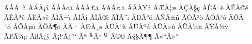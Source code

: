 \def\tura#1{{\edef\scf@{\the\scriptfont\fam}%
 \ifdim\fontdimen6\scf@=0pt\else\scf@\fi $^{\hbox{\b{#1}}}$}}

\def\do#1#2{\expandafter\def
 \csname\string^^c2\string#1@tex\endcsname{\string#1}}\doutfA

\def\dotexA{%
 \do^^c3^^80{\`A}\do^^c3^^a0{\`a}%
 \do^^c3^^81{\'A}\do^^c3^^a1{\'a}%
 \do^^c3^^82{\^A}\do^^c3^^a2{\^a}%
 \do^^c3^^83{\~A}\do^^c3^^a3{\~a}%
 \do^^c3^^84{\"A}\do^^c3^^a4{\"a}%
 \do^^c3^^85{\AA}\do^^c3^^a5{\aa}%
 \do^^c3^^86{\AE}\do^^c3^^a6{\ae}%
 \do^^c3^^87{\c C}\do^^c3^^a7{\c c}%
 \do^^c3^^88{\`E}\do^^c3^^a8{\`e}%
 \do^^c3^^89{\'E}\do^^c3^^a9{\'e}%
 \do^^c3^^8a{\^E}\do^^c3^^aa{\^e}%
 \do^^c3^^8b{\"E}\do^^c3^^ab{\"e}%
 \do^^c3^^8c{\`I}\do^^c3^^ac{\`\i}%
 \do^^c3^^8d{\'I}\do^^c3^^ad{\'\i}%
 \do^^c3^^8e{\^I}\do^^c3^^ae{\^\i}%
 \do^^c3^^8f{\"I}\do^^c3^^af{\"\i}%
 \do^^c3^^90{D}\do^^c3^^b0{d}%
 \do^^c3^^91{\~N}\do^^c3^^b1{\~n}%
 \do^^c3^^92{\`O}\do^^c3^^b2{\`o}%
 \do^^c3^^93{\'O}\do^^c3^^b3{\'o}%
 \do^^c3^^94{\^O}\do^^c3^^b4{\^o}%
 \do^^c3^^95{\~O}\do^^c3^^b5{\~o}%
 \do^^c3^^96{\"O}\do^^c3^^b6{\"o}%
 \do^^c3^^97{\times}\do^^c3^^b7{\div}%
 \do^^c3^^98{\O}\do^^c3^^b8{\o}%
 \do^^c3^^99{\`U}\do^^c3^^b9{\`u}%
 \do^^c3^^9a{\'U}\do^^c3^^ba{\'u}%
 \do^^c3^^9b{\^U}\do^^c3^^bb{\^u}%
 \do^^c3^^9c{\"U}\do^^c3^^bc{\"u}%
 \do^^c3^^9d{\'Y}\do^^c3^^bd{\'y}
 \do^^c3^^9e{P}\do^^c3^^be{p}%
 \do^^c3^^9f{\ss}\do^^c3^^bf{\"y}%
 \do^^c2^^a1{!`}\do^^c2^^bf{?`}%
 \do^^c2^^aa{\tura a}\do^^c2^^ba{\tura o}%
 \do^^c2^^a9{\copyright}%
 \do^^c2^^a7{\S}\do^^c2^^b6{\P}%
 \do^^c2^^ab{``}\do^^c2^^bb{''}%
}

\def\do#1#2#3{\expandafter\def
 \csname\string#1\string#2@tex\endcsname{#3}}\dotexA

\def\doutfB{%
 \do^^e2^^80^^92%
 \do^^e2^^80^^93%
 \do^^e2^^80^^94%
 \do^^e2^^80^^98%
 \do^^e2^^80^^99%
 \do^^e2^^80^^9a%
 \do^^e2^^80^^9c%
 \do^^e2^^80^^9d%
 \do^^e2^^80^^9e%
 \do^^e2^^80^^a0%
 \do^^e2^^80^^a1%
 \do^^e2^^80^^a6%
 \do^^e2^^80^^b0%
 \do^^e2^^80^^b9%
 \do^^e2^^80^^ba%
 \do^^e2^^82^^ac%
}

